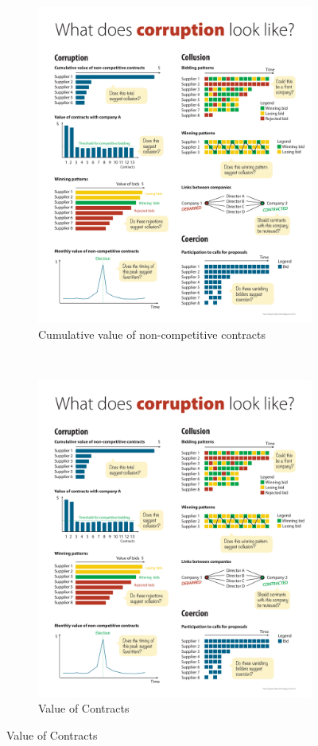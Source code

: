 \begin{figure}[H]
\begin{subfigure}[t]{0.5\textwidth}
\caption{Cumulative value of non-competitive contracts}
\includegraphics[max width=1\textwidth]{../img/poster_cumulative_value.pdf}
\end{subfigure}
~
\begin{subfigure}[t]{0.5\textwidth}
\caption{Value of Contracts}
\includegraphics[max width=1\textwidth]{../img/poster_value.pdf}

\end{subfigure}
\end{figure}
